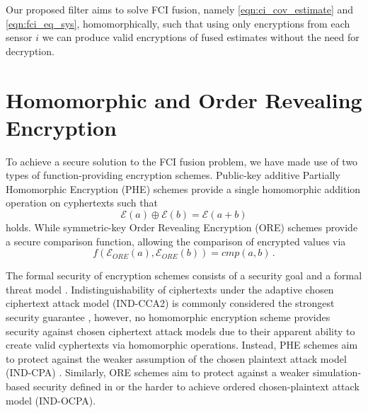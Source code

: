 \documentclass[letterpaper, 10 pt, conference]{ieeeconf}  %
\begin{document}
Our proposed filter aims to solve FCI fusion, namely \eqref{eqn:ci_cov_estimate} and \eqref{eqn:fci_eq_sys}, homomorphically, such that using only encryptions from each sensor $i$ we can produce valid encryptions of fused estimates without the need for decryption.




\section{Homomorphic and Order Revealing Encryption} \label{sec:encryption}
To achieve a secure solution to the FCI fusion problem, we have made use of two types of function-providing encryption schemes. Public-key additive Partially Homomorphic Encryption (PHE) schemes \cite{paillierPublicKeyCryptosystemsBased1999,goldwasserProbabilisticEncryption1984} provide a single homomorphic addition operation on cyphertexts such that
\begin{equation}
   \mathcal{E}(a) \oplus \mathcal{E}(b) = \mathcal{E}(a+b) \label{eqn:phe_eq}
\end{equation}
holds. While symmetric-key Order Revealing Encryption (ORE) schemes \cite{chenettePracticalOrderRevealingEncryption2016,lewiOrderRevealingEncryptionNew2016} provide a secure comparison function, allowing the comparison of encrypted values via
\begin{equation}
   f(\mathcal{E}_{ORE}(a), \mathcal{E}_{ORE}(b)) = cmp(a, b)\,. \label{eqn:ore_eq}
\end{equation}

The formal security of encryption schemes consists of a security goal and a formal threat model \cite{katzIntroductionModernCryptography2008}. Indistinguishability of ciphertexts under the adaptive chosen ciphertext attack model (IND-CCA2) is commonly considered the strongest security guarantee \cite{bellareRelationsNotionsSecurity1998}, however, no homomorphic encryption scheme provides security against chosen ciphertext attack models due to their apparent ability to create valid cyphertexts via homomorphic operations. Instead, PHE schemes aim to protect against the weaker assumption of the chosen plaintext attack model (IND-CPA) \cite{chaseSecurityHomomorphicEncryption2017}. Similarly, ORE schemes aim to protect against a weaker simulation-based security defined in \cite{chenettePracticalOrderRevealingEncryption2016} or the harder to achieve ordered chosen-plaintext attack model (IND-OCPA).
\end{document}
